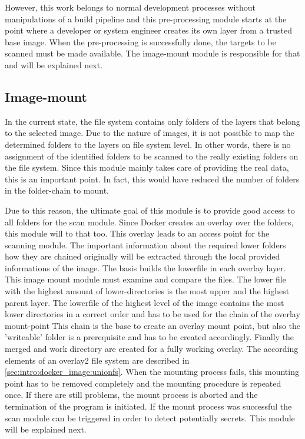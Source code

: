 However, this work belongs to normal development processes without manipulations of a build pipeline and this pre-processing module starts at the point where a developer or system engineer creates its own layer from a trusted base image. When the pre-processing is successfully done, the targets to be scanned must be made available. The image-mount module is responsible for that and will be explained next.

\subsection{Image-mount}
\label{ch:theory:analysing_process:imgmount}
In the current state, the file system contains only folders of the layers that belong to the selected image.
Due to the nature of images, it is not possible to map the determined folders to the layers on file system level. In other words, there is no assignment of the identified folders to be scanned to the really existing folders on the file system.
Since this module mainly takes care of providing the real data, this is an important point. In fact, this would have reduced the number of folders in the folder-chain to mount. 

Due to this reason, the ultimate goal of this module is to provide good access to all folders for the scan module. Since Docker creates an overlay over the folders, this module will to that too. This overlay leads to an access point for the scanning module. The important information about the required lower folders how they are chained originally will be extracted through the local provided informations of the image. The basis builds the lowerfile in each overlay layer. This image mount module must examine and compare the files. The lower file with the highest amount of lower-directories is the most upper and the highest parent layer.
The lowerfile of the highest level of the image contains the most lower directories in a correct order and has to be used for the chain of the overlay mount-point
This chain is the base to create an overlay mount point, but also the 'writeable' folder is a prerequisite and has to be created accordingly. Finally the merged and work directory are created for a fully working overlay. The according elements of an overlay2 file system are described in \ref{sec:intro:docker_image:unionfs}. When the mounting process fails, this mounting point has to be removed completely and the mounting procedure is repeated once. If there are still problems, the mount process is aborted and the termination of the program is initiated. If the mount process was successful the scan module can be triggered in order to detect potentially secrets. This module will be explained next.

